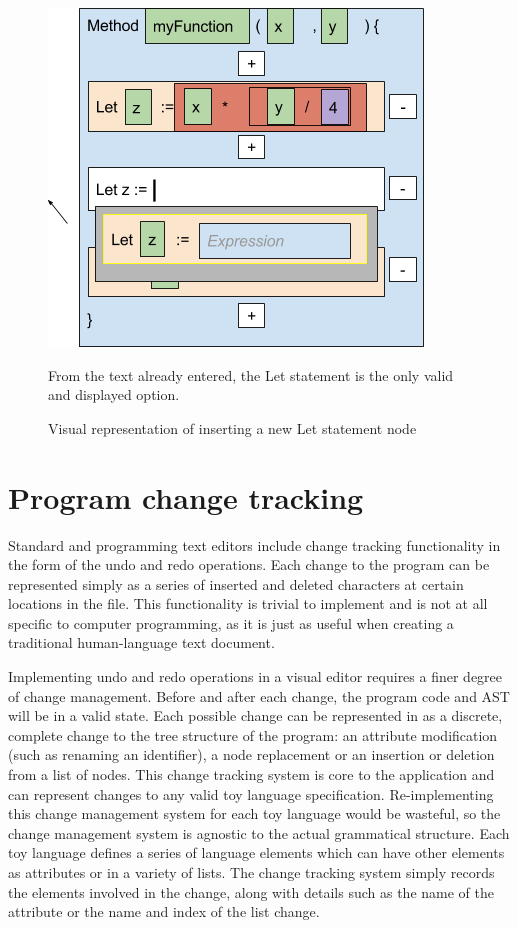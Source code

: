 \begin{figure}[H]
\centering
\includegraphics[scale=0.5]{graphics/astentry2} %
\caption{Visual representation of inserting a new Let statement node}

From the text already entered, the Let statement is the only valid and displayed option.
\label{fig:astentry2} %
\end{figure}

\section{Program change tracking}

Standard and programming text editors include change tracking functionality in the form of the undo and redo operations. Each change to the program can be represented simply as a series of inserted and deleted characters at certain locations in the file. This functionality is trivial to implement and is not at all specific to computer programming, as it is just as useful when creating a traditional human-language text document.

Implementing undo and redo operations in a visual editor requires a finer degree of change management. Before and after each change, the program code and AST will be in a valid state. Each possible change can be represented in as a discrete, complete change to the tree structure of the program: an attribute modification (such as renaming an identifier), a node replacement or an insertion or deletion from a list of nodes. This change tracking system is core to the application and can represent changes to any valid toy language specification. Re-implementing this change management system for each toy language would be wasteful, so the change management system is agnostic to the actual grammatical structure. Each toy language defines a series of language elements which can have other elements as attributes or in a variety of lists. The change tracking system simply records the elements involved in the change, along with details such as the name of the attribute or the name and index of the list change. 

